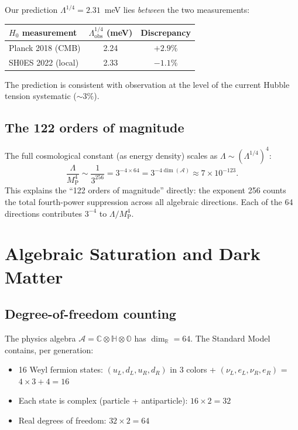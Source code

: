 \documentclass[12pt,a4paper]{article}
\theoremstyle{definition}
\theoremstyle{remark}
\newcommand{\Oct}{\mathbb{O}}
\newcommand{\Quat}{\mathbb{H}}
\newcommand{\Comp}{\mathbb{C}}
\newcommand{\Real}{\mathbb{R}}
\newcommand{\Alg}{\mathcal{A}}
\newcommand{\MP}{M_{\mathrm{P}}}
\begin{document}
Our prediction $\Lambda^{1/4} = 2.31$~meV lies \emph{between} the two 
measurements:
\begin{center}
\begin{tabular}{lcc}
\hline
$H_0$ measurement & $\Lambda^{1/4}_{\mathrm{obs}}$ (meV) & Discrepancy \\
\hline
Planck 2018 (CMB) & 2.24 & $+2.9\%$ \\
SH0ES 2022 (local) & 2.33 & $-1.1\%$ \\
\hline
\end{tabular}
\end{center}

The prediction is consistent with observation at the level of the current 
Hubble tension systematic ($\sim 3\%$).

\subsection{The 122 orders of magnitude}

The full cosmological constant (as energy density) scales as 
$\Lambda \sim (\Lambda^{1/4})^4$:
\begin{equation}
\frac{\Lambda}{\MP^4} \sim \frac{1}{3^{256}} = 3^{-4\times 64} 
= 3^{-4\dim(\Alg)} \approx 7 \times 10^{-123}.
\end{equation}
This explains the ``122 orders of magnitude'' directly: the exponent 
256 counts the total fourth-power suppression across all algebraic 
directions. Each of the 64 directions contributes $3^{-4}$ to $\Lambda/\MP^4$.

\section{Algebraic Saturation and Dark Matter}
\label{sec:dm}

\subsection{Degree-of-freedom counting}

The physics algebra $\Alg = \Comp\otimes\Quat\otimes\Oct$ has 
$\dim_\Real = 64$. The Standard Model contains, per generation:
\begin{itemize}
\item 16 Weyl fermion states: $(u_L, d_L, u_R, d_R)$ in 3 colors 
+ $(\nu_L, e_L, \nu_R, e_R)$ = $4\times 3 + 4 = 16$
\item Each state is complex (particle + antiparticle): $16 \times 2 = 32$
\item Real degrees of freedom: $32 \times 2 = 64$
\end{itemize}
\end{document}
